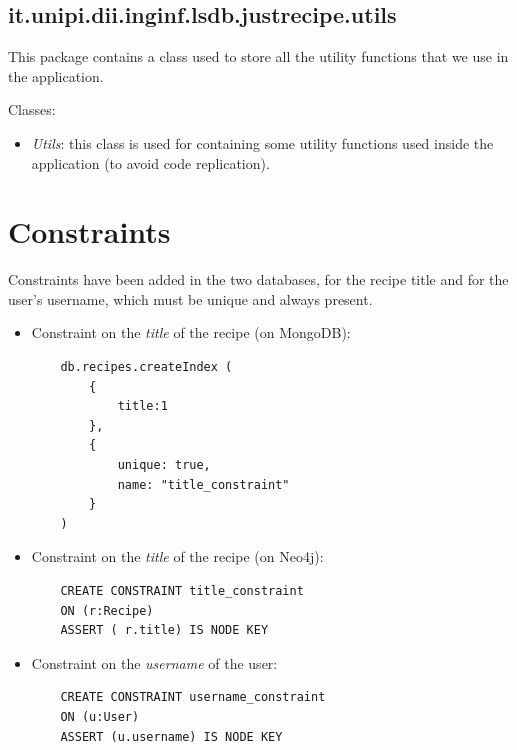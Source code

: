 \documentclass[a4paper]{report}
\begin{document}
\subsection {it.unipi.dii.inginf.lsdb.justrecipe.utils}
This package contains a class used to store all the utility functions that we use in the application.

\noindent Classes:
 \begin{itemize}
	\item \emph{Utils}: this class is used for containing some utility functions used inside the application (to avoid code replication).
\end{itemize}

\section{Constraints}
Constraints have been added in the two databases, for the recipe title and for the user's username, which must be unique and always present.
\begin{itemize}
	\item Constraint on the \emph{title} of the recipe (on MongoDB): 
	\lstset{ language=java}
	\begin{lstlisting}
	db.recipes.createIndex (
		{
			title:1
		},
		{
			unique: true,
			name: "title_constraint"
		}
	)	
	\end{lstlisting} 
	\item Constraint on the \emph{title} of the recipe (on Neo4j): 
	\begin{lstlisting}
	CREATE CONSTRAINT title_constraint 
	ON (r:Recipe) 
	ASSERT ( r.title) IS NODE KEY	
	\end{lstlisting} 
	\item Constraint on the \emph{username} of the user: 
	\lstset{ language=java}
	\begin{lstlisting}
	CREATE CONSTRAINT username_constraint 
	ON (u:User) 
	ASSERT (u.username) IS NODE KEY	
	\end{lstlisting} 
\end{itemize}
\end{document}
